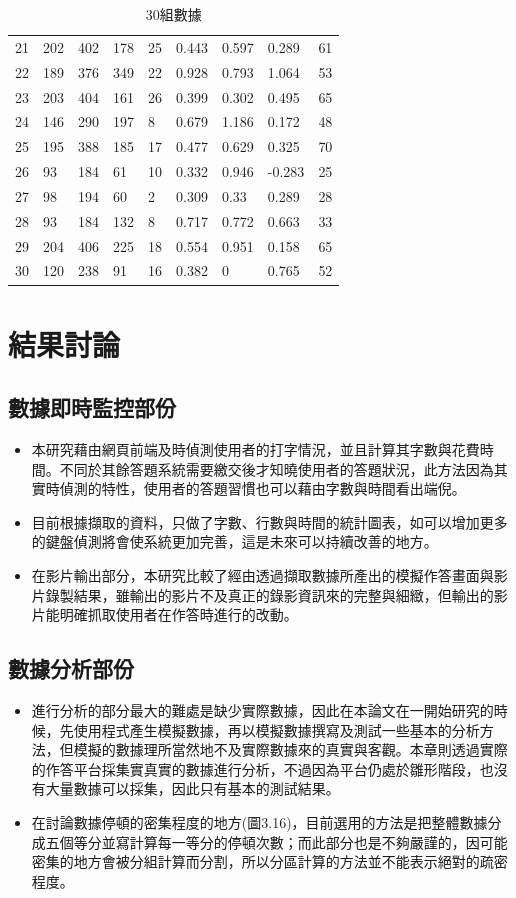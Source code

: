 \begin{table}[]
\begin{tabular}{lllllllll}
		21 & 202 & 402 & 178    & 25     & 0.443  & 0.597  & 0.289  & 61      \\
		22 & 189 & 376 & 349    & 22     & 0.928  & 0.793  & 1.064  & 53      \\
		23 & 203 & 404 & 161    & 26     & 0.399  & 0.302  & 0.495  & 65      \\
		24 & 146 & 290 & 197    & 8      & 0.679  & 1.186  & 0.172  & 48      \\
		25 & 195 & 388 & 185    & 17     & 0.477  & 0.629  & 0.325  & 70      \\
		26 & 93  & 184 & 61     & 10     & 0.332  & 0.946  & -0.283 & 25      \\
		27 & 98  & 194 & 60     & 2      & 0.309  & 0.33   & 0.289  & 28      \\
		28 & 93  & 184 & 132    & 8      & 0.717  & 0.772  & 0.663  & 33      \\
		29 & 204 & 406 & 225    & 18     & 0.554  & 0.951  & 0.158  & 65      \\
		30 & 120 & 238 & 91     & 16     & 0.382  & 0      & 0.765  & 52     
	\end{tabular}
\caption{30組數據}
\end{table}

\newpage
\section{結果討論}
\subsection{數據即時監控部份}
\begin{itemize}
	\item 本研究藉由網頁前端及時偵測使用者的打字情況，並且計算其字數與花費時間。不同於其餘答題系統需要繳交後才知曉使用者的答題狀況，此方法因為其實時偵測的特性，使用者的答題習慣也可以藉由字數與時間看出端倪。
	\item 目前根據擷取的資料，只做了字數、行數與時間的統計圖表，如可以增加更多的鍵盤偵測將會使系統更加完善，這是未來可以持續改善的地方。
	\item 在影片輸出部分，本研究比較了經由透過擷取數據所產出的模擬作答畫面與影片錄製結果，雖輸出的影片不及真正的錄影資訊來的完整與細緻，但輸出的影片能明確抓取使用者在作答時進行的改動。
\end{itemize}
\subsection{數據分析部份}
\begin{itemize}
	\item 進行分析的部分最大的難處是缺少實際數據，因此在本論文在一開始研究的時候，先使用程式產生模擬數據，再以模擬數據撰寫及測試一些基本的分析方法，但模擬的數據理所當然地不及實際數據來的真實與客觀。本章則透過實際的作答平台採集實真實的數據進行分析，不過因為平台仍處於雛形階段，也沒有大量數據可以採集，因此只有基本的測試結果。
	\item 在討論數據停頓的密集程度的地方(圖3.16)，目前選用的方法是把整體數據分成五個等分並寫計算每一等分的停頓次數；而此部分也是不夠嚴謹的，因可能密集的地方會被分組計算而分割，所以分區計算的方法並不能表示絕對的疏密程度。
\end{itemize}
